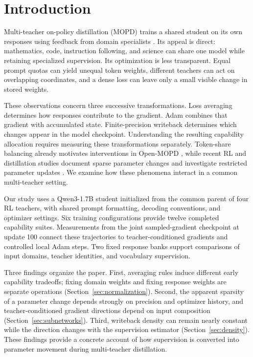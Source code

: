 \section{Introduction}

Multi-teacher on-policy distillation (MOPD) trains a shared student on its own responses using feedback from domain specialists \citep{ma2026mopdmultiteacheronpolicydistillation}. Its appeal is direct: mathematics, code, instruction following, and science can share one model while retaining specialized supervision. Its optimization is less transparent. Equal prompt quotas can yield unequal token weights, different teachers can act on overlapping coordinates, and a dense loss can leave only a small visible change in stored weights.

These observations concern three successive transformations. Loss averaging determines how responses contribute to the gradient. Adam combines that gradient with accumulated state. Finite-precision writeback determines which changes appear in the model checkpoint. Understanding the resulting capability allocation requires measuring these transformations separately. Token-share balancing already motivates interventions in Open-MOPD \citep{gao2026openmopddiagnosingfixingcapability}, while recent RL and distillation studies document sparse parameter changes and investigate restricted parameter updates \citep{mukherjee2025subnetworks,yu2026denseupdates}. We examine how these phenomena interact in a common multi-teacher setting.

Our study uses a Qwen3-1.7B student initialized from the common parent of four RL teachers, with shared prompt formatting, decoding conventions, and optimizer settings. Six training configurations provide twelve completed capability suites. Measurements from the joint sampled-gradient checkpoint at update 100 connect these trajectories to teacher-conditioned gradients and controlled local Adam steps. Two fixed response banks support comparisons of input domains, teacher identities, and vocabulary supervision.

Three findings organize the paper. First, averaging rules induce different early capability tradeoffs; fixing domain weights and fixing response weights are separate operations (Section~\ref{sec:normalization}). Second, the apparent sparsity of a parameter change depends strongly on precision and optimizer history, and teacher-conditioned gradient directions depend on input composition (Section~\ref{sec:subnetworks}). Third, writeback density can remain nearly constant while the direction changes with the supervision estimator (Section~\ref{sec:density}). These findings provide a concrete account of how supervision is converted into parameter movement during multi-teacher distillation.
